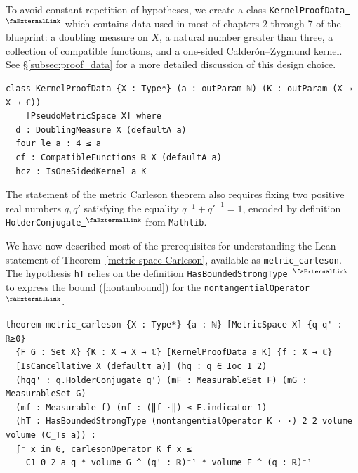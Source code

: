 \documentclass[12pt]{amsart}
\newcounter{lstlisting}[section]
\newcommand{\lean}[1]{\lstinline{#1}}
\newcommand{\mathlib}{\texttt{Mathlib}\xspace}
\newcommand{\extlink}{~\ensuremath{{}^\text{\faExternalLink}}}
\theoremstyle{definition}
\theoremstyle{plain}
\begin{document}
To avoid constant repetition of hypotheses, we create a class \lean{KernelProofData}\href{https://github.com/fpvandoorn/carleson/blob/020d6e5c71d731952eb0379d222eea4049103ca0/Carleson/Defs.lean#L261}{\extlink} which contains data used in most of chapters 2 through 7 of the blueprint: a doubling measure on $X$, a natural number greater than three, a collection of compatible functions, and a one-sided Calder\'on--Zygmund kernel. See \S\ref{subsec:proof_data} for a more detailed discussion of this design choice.
\begin{lstlisting}[mathescape]
class KernelProofData {X : Type*} (a : outParam ℕ) (K : outParam (X → X → ℂ))
    [PseudoMetricSpace X] where
  d : DoublingMeasure X (defaultA a)
  four_le_a : 4 ≤ a
  cf : CompatibleFunctions ℝ X (defaultA a)
  hcz : IsOneSidedKernel a K
\end{lstlisting}

The statement of the metric Carleson theorem also requires fixing two positive real numbers $q, q'$ satisfying the equality $q^{-1} + q'^{-1} = 1$, encoded by definition \lean{HolderConjugate}\href{https://github.com/leanprover-community/mathlib4/blob/5a0753dc725610d074b177e4677000ee96165b8e/Mathlib/Data/Real/ConjExponents.lean#L59}{\extlink} from \mathlib.

We have now described most of the prerequisites for understanding the Lean statement of Theorem~\ref{metric-space-Carleson}, available as
\lean{metric_carleson}. The hypothesis \lean{hT} relies on the definition \lean{HasBoundedStrongType}\href{https://github.com/fpvandoorn/carleson/blob/020d6e5c71d731952eb0379d222eea4049103ca0/Carleson/Defs.lean#L80}{\extlink} to express the bound (\ref{nontanbound}) for the
\lean{nontangentialOperator}\href{https://github.com/fpvandoorn/carleson/blob/020d6e5c71d731952eb0379d222eea4049103ca0/Carleson/Defs.lean#L211}{\extlink}.

\begin{lstlisting}[mathescape]
theorem metric_carleson {X : Type*} {a : ℕ} [MetricSpace X] {q q' : ℝ≥0}
  {F G : Set X} {K : X → X → ℂ} [KernelProofData a K] {f : X → ℂ}
  [IsCancellative X (defaultτ a)] (hq : q ∈ Ioc 1 2)
  (hqq' : q.HolderConjugate q') (mF : MeasurableSet F) (mG : MeasurableSet G)
  (mf : Measurable f) (nf : (‖f ·‖) ≤ F.indicator 1)
  (hT : HasBoundedStrongType (nontangentialOperator K · ·) 2 2 volume volume (C_Ts a)) :
  ∫⁻ x in G, carlesonOperator K f x ≤
    C1_0_2 a q * volume G ^ (q' : ℝ)⁻¹ * volume F ^ (q : ℝ)⁻¹
\end{lstlisting}
\end{document}
